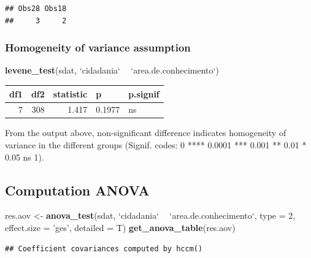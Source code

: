 \documentclass[]{article}
\newenvironment{Shaded}{\begin{snugshade}}{\end{snugshade}}
\newcommand{\DataTypeTok}[1]{\textcolor[rgb]{0.13,0.29,0.53}{#1}}
\newcommand{\DecValTok}[1]{\textcolor[rgb]{0.00,0.00,0.81}{#1}}
\newcommand{\KeywordTok}[1]{\textcolor[rgb]{0.13,0.29,0.53}{\textbf{#1}}}
\newcommand{\NormalTok}[1]{#1}
\newcommand{\OperatorTok}[1]{\textcolor[rgb]{0.81,0.36,0.00}{\textbf{#1}}}
\newcommand{\StringTok}[1]{\textcolor[rgb]{0.31,0.60,0.02}{#1}}
\begin{document}
\begin{verbatim}
## Obs28 Obs18 
##     3     2
\end{verbatim}

\hypertarget{homogeneity-of-variance-assumption}{%
\subsubsection{Homogeneity of variance
assumption}\label{homogeneity-of-variance-assumption}}

\begin{Shaded}
\begin{Highlighting}[]
\KeywordTok{levene_test}\NormalTok{(sdat, }\StringTok{`}\DataTypeTok{cidadania}\StringTok{`} \OperatorTok{~}\StringTok{ `}\DataTypeTok{area.de.conhecimento}\StringTok{`}\NormalTok{)}
\end{Highlighting}
\end{Shaded}

\begin{longtable}[]{@{}rrrll@{}}
\toprule
df1 & df2 & statistic & p & p.signif\tabularnewline
\midrule
\endhead
7 & 308 & 1.417 & 0.1977 & ns\tabularnewline
\bottomrule
\end{longtable}

From the output above, non-significant difference indicates homogeneity
of variance in the different groups (Signif. codes: 0 **** 0.0001 ***
0.001 ** 0.01 * 0.05 ns 1).

\hypertarget{computation-anova}{%
\subsection{Computation ANOVA}\label{computation-anova}}

\begin{Shaded}
\begin{Highlighting}[]
\NormalTok{res.aov <-}\StringTok{ }\KeywordTok{anova_test}\NormalTok{(sdat, }\StringTok{`}\DataTypeTok{cidadania}\StringTok{`} \OperatorTok{~}\StringTok{ `}\DataTypeTok{area.de.conhecimento}\StringTok{`}\NormalTok{, }\DataTypeTok{type =} \DecValTok{2}\NormalTok{, }\DataTypeTok{effect.size =} \StringTok{'ges'}\NormalTok{, }\DataTypeTok{detailed =}\NormalTok{ T)}
\KeywordTok{get_anova_table}\NormalTok{(res.aov)}
\end{Highlighting}
\end{Shaded}

\begin{verbatim}
## Coefficient covariances computed by hccm()
\end{verbatim}
\end{document}
